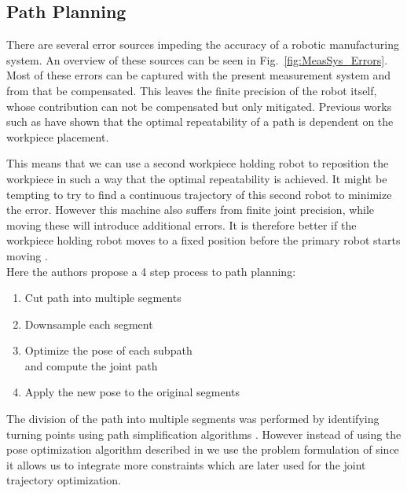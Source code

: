 \documentclass[5p,times,procedia]{elsarticle}
\newcommand{\rem}[1]{\textcolor{red}{\sout{#1}}}
\newcommand{\prop}[1]{\textcolor{blue}{#1}}
\begin{document}
\subsection{Path Planning}\label{subsec:PathPlanning}
There are several error sources impeding the accuracy of a robotic manufacturing system.
An overview of these sources can be seen in Fig.~\ref{fig:MeasSys_Errors}.
Most of these errors can be captured with the present measurement system and from that be compensated.
%
This leaves the finite precision of the robot itself, whose contribution can not be compensated but only mitigated.
Previous works such as \cite{previous_work} have shown that the optimal repeatability of a path is dependent on the workpiece placement.

This means that we can use a second workpiece holding robot to reposition the workpiece in such a way that the optimal repeatability is achieved.
It might be tempting to try to find a continuous trajectory of this second robot to minimize the error.
However this machine also suffers from finite joint precision, while moving these will introduce additional errors.
It is therefore better if the workpiece holding robot moves to a fixed position before the primary robot starts moving \prop{\cite{stroke_division}}. %
\prop{\\}
Here the authors propose a 4 step process to path planning:
\begin{enumerate}
	\setlength\itemsep{-0.5em}
	\item Cut path into multiple segments
	\item Downsample each segment
	\item Optimize the pose of each subpath\\and compute the joint path
	\item Apply the new pose to the original segments
\end{enumerate}
The division of the path into multiple segments was performed by identifying turning points using path simplification algorithms \cite{stroke_division}.
However instead of using the pose optimization algorithm described in \cite{stroke_division} we use the problem formulation of \cite{previous_work} since it allows us to integrate more constraints which are later used for the joint trajectory optimization.
%
%
%
%
\end{document}
